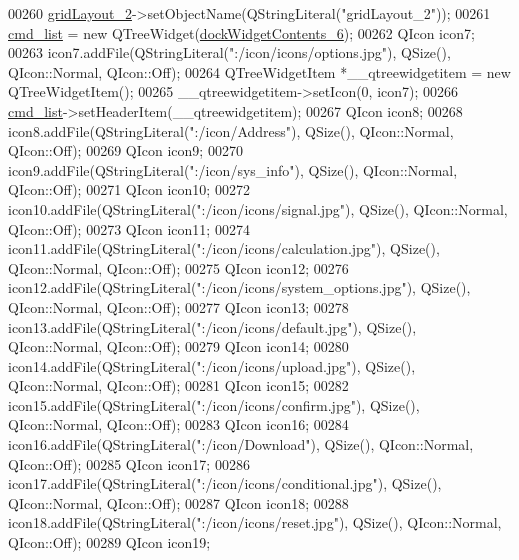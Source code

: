 \begin{DoxyCode}
00260         \hyperlink{a00027_a6b2a0c5f7e8ff2a87134908dd770d2d2}{gridLayout\_2}->setObjectName(QStringLiteral(\textcolor{stringliteral}{"gridLayout\_2"}));
00261         \hyperlink{a00027_aa66ece71395b435e915d384fb63bac1d}{cmd\_list} = \textcolor{keyword}{new} QTreeWidget(\hyperlink{a00027_a23b450a9debad2b0fecc6f063772caf2}{dockWidgetContents\_6});
00262         QIcon icon7;
00263         icon7.addFile(QStringLiteral(\textcolor{stringliteral}{":/icon/icons/options.jpg"}), QSize(), QIcon::Normal, QIcon::Off);
00264         QTreeWidgetItem *\_\_qtreewidgetitem = \textcolor{keyword}{new} QTreeWidgetItem();
00265         \_\_qtreewidgetitem->setIcon(0, icon7);
00266         \hyperlink{a00027_aa66ece71395b435e915d384fb63bac1d}{cmd\_list}->setHeaderItem(\_\_qtreewidgetitem);
00267         QIcon icon8;
00268         icon8.addFile(QStringLiteral(\textcolor{stringliteral}{":/icon/Address"}), QSize(), QIcon::Normal, QIcon::Off);
00269         QIcon icon9;
00270         icon9.addFile(QStringLiteral(\textcolor{stringliteral}{":/icon/sys\_info"}), QSize(), QIcon::Normal, QIcon::Off);
00271         QIcon icon10;
00272         icon10.addFile(QStringLiteral(\textcolor{stringliteral}{":/icon/icons/signal.jpg"}), QSize(), QIcon::Normal, QIcon::Off);
00273         QIcon icon11;
00274         icon11.addFile(QStringLiteral(\textcolor{stringliteral}{":/icon/icons/calculation.jpg"}), QSize(), QIcon::Normal, QIcon::Off);
00275         QIcon icon12;
00276         icon12.addFile(QStringLiteral(\textcolor{stringliteral}{":/icon/icons/system\_options.jpg"}), QSize(), QIcon::Normal, 
      QIcon::Off);
00277         QIcon icon13;
00278         icon13.addFile(QStringLiteral(\textcolor{stringliteral}{":/icon/icons/default.jpg"}), QSize(), QIcon::Normal, QIcon::Off);
00279         QIcon icon14;
00280         icon14.addFile(QStringLiteral(\textcolor{stringliteral}{":/icon/icons/upload.jpg"}), QSize(), QIcon::Normal, QIcon::Off);
00281         QIcon icon15;
00282         icon15.addFile(QStringLiteral(\textcolor{stringliteral}{":/icon/icons/confirm.jpg"}), QSize(), QIcon::Normal, QIcon::Off);
00283         QIcon icon16;
00284         icon16.addFile(QStringLiteral(\textcolor{stringliteral}{":/icon/Download"}), QSize(), QIcon::Normal, QIcon::Off);
00285         QIcon icon17;
00286         icon17.addFile(QStringLiteral(\textcolor{stringliteral}{":/icon/icons/conditional.jpg"}), QSize(), QIcon::Normal, QIcon::Off);
00287         QIcon icon18;
00288         icon18.addFile(QStringLiteral(\textcolor{stringliteral}{":/icon/icons/reset.jpg"}), QSize(), QIcon::Normal, QIcon::Off);
00289         QIcon icon19;

\end{DoxyCode}
